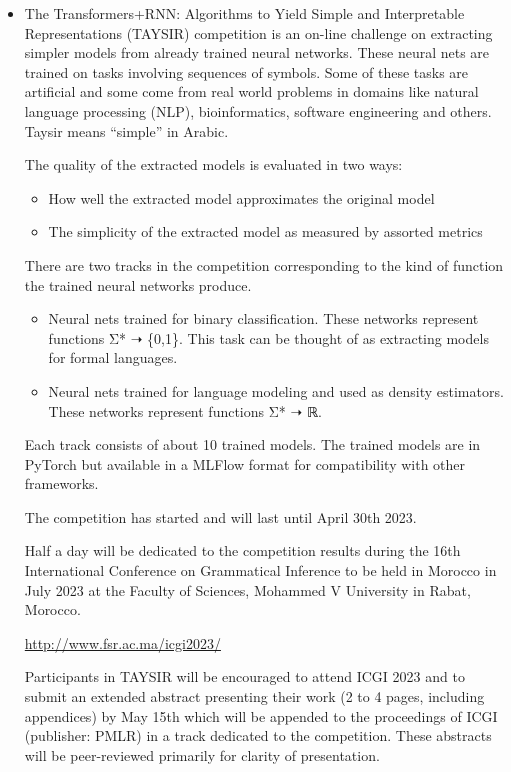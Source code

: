 \documentclass[prodmode,acmtecs]{acmsmall} %
\begin{document}
\begin{itemize}\item  The Transformers+RNN: Algorithms to Yield Simple and Interpretable Representations (TAYSIR) competition is an on-line challenge on extracting simpler models from already trained neural networks. These neural nets are trained on tasks involving sequences of symbols. Some of these tasks are artificial and some come from real world problems in domains like natural language processing (NLP), bioinformatics, software engineering and others. Taysir means ``simple'' in Arabic. 
 
  The quality of the extracted models is evaluated in two ways: 
 
\begin{itemize}\item  How well the extracted model approximates the original model
\item  The simplicity of the extracted model as measured by assorted metrics
\end{itemize} 
  There are two tracks in the competition corresponding to the kind of function the trained neural networks produce.  
 
\begin{itemize}\item  Neural nets trained for binary classification. These networks represent functions Σ* ➝ \{0,1\}. This task can be thought of as extracting models for formal languages.
\item  Neural nets trained for language modeling and used as density estimators. These networks represent functions Σ* ➝ ℝ. 
\end{itemize} 
  Each track consists of about 10 trained models. The trained models are in PyTorch but available in a MLFlow format for compatibility with other frameworks. 
 
  The competition has started and will last until April 30th 2023. 
 
  Half a day will be dedicated to the competition results during the 16th International Conference on Grammatical Inference to be held in Morocco in July 2023 at the Faculty of Sciences, Mohammed V University in Rabat, Morocco. 
 
  \href{http://www.fsr.ac.ma/icgi2023/}{http://www.fsr.ac.ma/icgi2023/} 
 
  Participants in TAYSIR will be encouraged to attend ICGI 2023 and to submit an extended abstract presenting their work (2 to 4 pages, including appendices) by May 15th which will be appended to the proceedings of ICGI (publisher: PMLR) in a track dedicated to the competition. These abstracts will be peer-reviewed primarily for clarity of presentation. 
 

\end{itemize}
\end{document}

